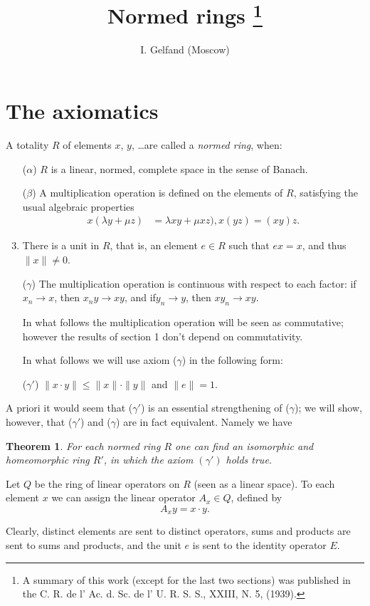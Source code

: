 \documentclass{article}
\title{Normed rings \footnote{A summary of this work (except for the last two sections) was published in the C. R. de l' Ac. d. Sc. de l' U. R. S. S., XXIII, N. 5, (1939).}}
\author{I. Gelfand (Moscow)}
\date{}%
\newtheorem{theorem}{Theorem}
\theoremstyle{definition}
\begin{document}
\maketitle

\section{The axiomatics}
A totality $R$ of elements $x$, $y$, \dots are called a \emph{normed ring}, when:
\begin{enumerate}
\item [($\alpha$)] $R$ is a linear, normed, complete space in the sense of Banach.
\item [($\beta$)] A multiplication operation is defined on the elements of $R$, satisfying the usual algebraic properties
  \begin{align*}
    x(\lambda y + \mu z) &= \lambda xy + \mu xz),
    x(yz) = (xy)z.
  \end{align*}
\item There is a unit in $R$, that is, an element $e\in R$ such that $ex=x$, and thus $\| x \| \neq 0$.
\item [($\gamma$)]
  The multiplication operation is continuous with respect to each factor: if $x_n \to x$, then $x_n y \to xy$, and if$y_n \to y$, then $xy_n \to xy$.
  
  In what follows the multiplication operation will be seen as commutative; however the results of section 1 don't depend on commutativity.

  In what follows we will use axiom ($\gamma$) in the following form:
\item [($\gamma'$)] $\|x\cdot y\| \leq \|x\|\cdot\|y\|$ and $\|e\| = 1$.
\end{enumerate}
A priori it would seem that ($\gamma'$) is an essential strengthening of ($\gamma$); we will show, however, that ($\gamma'$) and ($\gamma$) are in fact equivalent. Namely we have
\begin{theorem}
  For each normed ring $R$ one can find an isomorphic and homeomorphic ring $R'$, in which the axiom $(\gamma')$ holds true.
\end{theorem}
Let $Q$ be the ring of linear operators on $R$ (seen as a linear space). To each element $x$ we can assign the linear operator $A_x\in Q$, defined by
$$A_x y = x\cdot y.$$

Clearly, distinct elements are sent to distinct operators, sums and products are sent to sums and products, and the unit $e$ is sent to the identity operator $E$.
\end{document}

